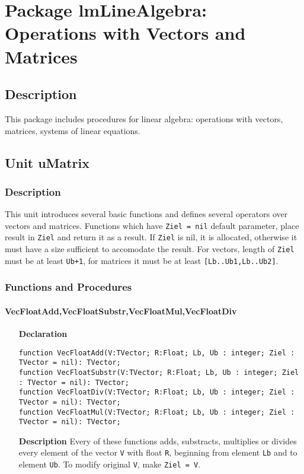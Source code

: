 \documentclass[12pt,a4paper,oneside]{report}
\newcommand{\lmath}[1]{   %
	\marginpar{\vspace{#1} 
		\begin{flushright}
			LMath
	\end{flushright} }
}
\newcommand{\declarationitem}[1]{\textbf{#1}}
\newcommand{\descriptiontitle}[1]{\textbf{#1}}
\newcommand{\code}[1]{\texttt{#1}}
\begin{document}
\chapter[Package lmLineAlgebra]{Package lmLineAlgebra: Operations with Vectors and Matrices}\label{package-lmLineAlgebra}
\section{Description}
This package includes procedures for linear algebra: operations with vectors, matrices, systems of linear equations.
\section{Unit uMatrix}
\lmath{-28pt}
\label{umatrix} 
\subsection{Description}
This unit introduces several basic functions  and defines several operators over vectors and matrices.  Functions which have \code{Ziel = nil} default parameter, place result in \code{Ziel} and return it as a result. If \code{Ziel} is nil, it is allocated, otherwise it must have a size sufficient to accomodate the result. For vectors, length of \code{Ziel} must be at least \code{Ub+1}, for matrices it must be at least \code{[Lb..Ub1,Lb..Ub2]}.
\subsection{Functions and Procedures}
\subsubsection{VecFloatAdd,VecFloatSubstr,VecFloatMul,VecFloatDiv}
\label{VecFloatAdd}
\begin{itemize}
	\item[\declarationitem{Declaration}\hfill]
	\begin{flushleft}
	\code{function VecFloatAdd(V:TVector; R:Float; Lb, Ub : integer; Ziel : TVector = nil): TVector;\\
	function VecFloatSubstr(V:TVector; R:Float; Lb, Ub : integer; Ziel : TVector = nil): TVector;\\
	function VecFloatDiv(V:TVector; R:Float; Lb, Ub : integer; Ziel : TVector = nil): TVector;\\
	function VecFloatMul(V:TVector; R:Float; Lb, Ub : integer;  Ziel : TVector = nil): TVector;}
	\end{flushleft}
	\item[\descriptiontitle{Description}]
	Every of these functions adds, substracts, multiplies or divides every element of the vector \code{V} with float \code{R}, beginning from element \code{Lb} and to element \code{Ub}. To modify original \code{V}, make \code{Ziel = V}. 
\end{itemize} 
\end{document}

